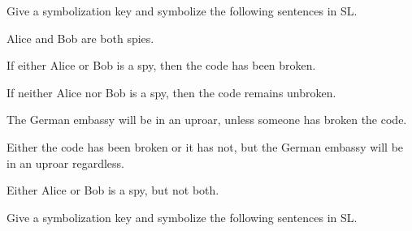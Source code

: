 \problempart
\label{pr.spies}
Give a symbolization key and symbolize the following sentences in SL. \\
\begin{earg}
\item Alice and Bob are both spies. %
\item If either Alice or Bob is a spy, then the code has been broken. %
\item If neither Alice nor Bob is a spy, then the code remains unbroken.%
\item The German embassy will be in an uproar, unless someone has broken the code.%
\item Either the code has been broken or it has not, but the German embassy will be in an uproar regardless. %
\item Either Alice or Bob is a spy, but not both. %
\end{earg}


\problempart Give a symbolization key and symbolize the following sentences in SL.

